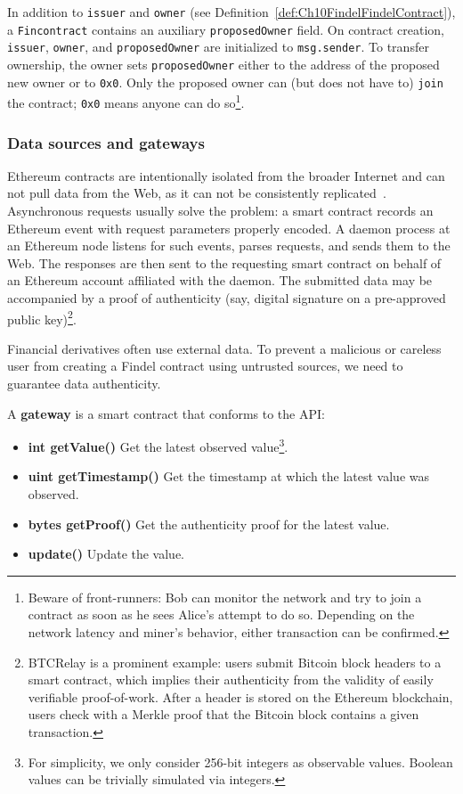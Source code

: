 In addition to \texttt{issuer} and \texttt{owner} (see Definition~\ref{def:Ch10FindelFindelContract}), a \texttt{Fincontract} contains an auxiliary \texttt{proposedOwner} field.
On contract creation, \texttt{issuer}, \texttt{owner}, and \texttt{proposedOwner} are initialized to \texttt{msg.sender}.
To transfer ownership, the owner sets \texttt{proposedOwner} either to the address of the proposed new owner or to \texttt{0x0}.
Only the proposed owner can (but does not have to) \texttt{join} the contract; \texttt{0x0} means anyone can do so\footnote{Beware of front-runners: Bob can monitor the network and try to join a contract as soon as he sees Alice's attempt to do so. Depending on the network latency and miner's behavior, either transaction can be confirmed.}.


\subsubsection{Data sources and gateways} \label{def:Ch10FindelGateways}

Ethereum contracts are intentionally isolated from the broader Internet and can not pull data from the Web, as it can not be consistently replicated~\cite{Greenspan2016}.
Asynchronous requests usually solve the problem: a smart contract records an Ethereum event with request parameters properly encoded.
A daemon process at an Ethereum node listens for such events, parses requests, and sends them to the Web.
The responses are then sent to the requesting smart contract on behalf of an Ethereum account affiliated with the daemon.
The submitted data may be accompanied by a proof of authenticity (say, digital signature on a pre-approved public key)\footnote{BTCRelay is a prominent example: users submit Bitcoin block headers to a smart contract, which implies their authenticity from the validity of easily verifiable proof-of-work. After a header is stored on the Ethereum blockchain, users check with a Merkle proof that the Bitcoin block contains a given transaction.}.

Financial derivatives often use external data.
To prevent a malicious or careless user from creating a Findel contract using untrusted sources, we need to guarantee data authenticity.

\begin{definition}
	A \textbf{gateway} is a smart contract that conforms to the API:
	
	\begin{itemize}
		\item \textbf{int getValue()} Get the latest observed value\footnote{For simplicity, we only consider 256-bit integers as observable values. Boolean values can be trivially simulated via integers.}.
		\item \textbf{uint getTimestamp()} Get the timestamp at which the latest value was observed.
		\item \textbf{bytes getProof()} Get the authenticity proof for the latest value.
		\item \textbf{update()} Update the value.
	\end{itemize}
	
\end{definition}

